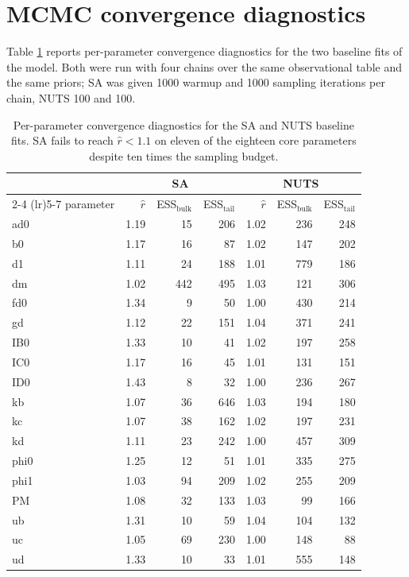 \documentclass[11pt]{article}
\begin{document}


\section{MCMC convergence diagnostics}
\label{mcmc}

Table \ref{tab:convergence} reports per-parameter convergence diagnostics for the two baseline fits of the \citet{griffin_estimates_2014} model. Both were run with four chains over the same observational table and the same priors; SA was given 1000 warmup and 1000 sampling iterations per chain, NUTS 100 and 100.

\begin{table}[h]
\centering
\begin{tabular}{l r r r r r r}
\toprule
& \multicolumn{3}{c}{SA} & \multicolumn{3}{c}{NUTS} \\
\cmidrule(lr){2-4} \cmidrule(lr){5-7}
parameter & $\hat{r}$ & ESS$_{\mathrm{bulk}}$ & ESS$_{\mathrm{tail}}$ & $\hat{r}$ & ESS$_{\mathrm{bulk}}$ & ESS$_{\mathrm{tail}}$ \\
\midrule
ad0 & 1.19 & 15 & 206 & 1.02 & 236 & 248 \\
b0 & 1.17 & 16 & 87 & 1.02 & 147 & 202 \\
d1 & 1.11 & 24 & 188 & 1.01 & 779 & 186 \\
dm & 1.02 & 442 & 495 & 1.03 & 121 & 306 \\
fd0 & 1.34 & 9 & 50 & 1.00 & 430 & 214 \\
gd & 1.12 & 22 & 151 & 1.04 & 371 & 241 \\
IB0 & 1.33 & 10 & 41 & 1.02 & 197 & 258 \\
IC0 & 1.17 & 16 & 45 & 1.01 & 131 & 151 \\
ID0 & 1.43 & 8 & 32 & 1.00 & 236 & 267 \\
kb & 1.07 & 36 & 646 & 1.03 & 194 & 180 \\
kc & 1.07 & 38 & 162 & 1.02 & 197 & 231 \\
kd & 1.11 & 23 & 242 & 1.00 & 457 & 309 \\
phi0 & 1.25 & 12 & 51 & 1.01 & 335 & 275 \\
phi1 & 1.03 & 94 & 209 & 1.02 & 255 & 209 \\
PM & 1.08 & 32 & 133 & 1.03 & 99 & 166 \\
ub & 1.31 & 10 & 59 & 1.04 & 104 & 132 \\
uc & 1.05 & 69 & 230 & 1.00 & 148 & 88 \\
ud & 1.33 & 10 & 33 & 1.01 & 555 & 148 \\
\bottomrule
\end{tabular}
  \caption{Per-parameter convergence diagnostics for the SA and NUTS baseline fits. SA fails to reach $\hat{r} < 1.1$ on eleven of the eighteen core parameters despite ten times the sampling budget.}
  \label{tab:convergence}
\end{table}
\end{document}
